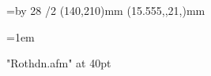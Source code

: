 \fontfam[arno]
\fontfam[unifrakturmaguntia]
\typosize[12/14.03]

\hsize=93.333mm
\vsize=\topskip \advance\vsize by 28\baselineskip
\margins/2 (140,210)mm (15.555,,21,)mm

\colsep=6mm


\parskip0pt
\parindent=1em


\everymnote{\it}
\mnoteindent=4mm
\mnotesize=20mm

\font\roth "Rothdn.afm" at 40pt\relax

\def\Vermillion{\setcmykcolor{0 71 77 11}}


\def\title#1{%
    \centerline{%
		\Arno
    	\typosize[15/]%
    	#1%
    }%
    \vskip2\baselineskip
    \_firstnoindent
}

\def\section#1{%
    \vskip0.5\baselineskip
    \centerline{%
		\Arno\it
    	\lower 1ex \hbox{#1}%
    }%
    \vskip0.5\baselineskip
    \_firstnoindent
}


%

